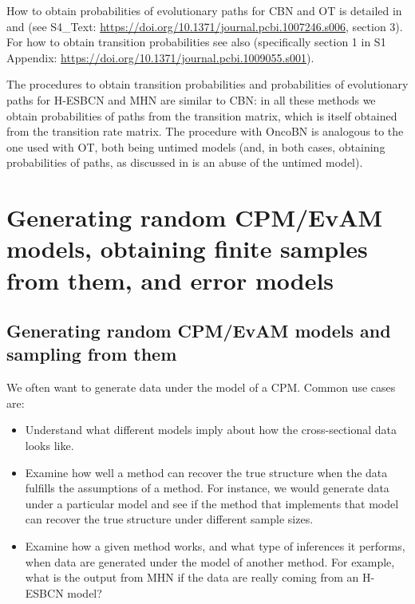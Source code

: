 \documentclass[a4paper,11pt]{article}
\begin{document}
How to obtain probabilities of evolutionary paths for CBN and OT is detailed in \cite{hosseini2019a} and \cite{diaz2019every} (see S4\_Text: \url{https://doi.org/10.1371/journal.pcbi.1007246.s006}, section 3). For how to obtain transition probabilities see also \cite{diaz2021conditional} (specifically section 1 in S1 Appendix: \url{https://doi.org/10.1371/journal.pcbi.1009055.s001}).

The procedures to obtain transition probabilities and probabilities of evolutionary paths for H-ESBCN and MHN are similar to CBN: in all these methods we obtain probabilities of paths from the transition matrix, which is itself obtained from the transition rate matrix. The procedure with OncoBN is analogous to the one used with OT, both being untimed models (and, in both cases, obtaining probabilities of paths, as discussed in \citealp{diaz2019every} is an abuse of the untimed model). 


\section{Generating random CPM/EvAM models, obtaining finite samples from them, and error models}\label{sec:random_evam}


\subsection{Generating random CPM/EvAM models and sampling from them}\label{subsec:random_evam}
We often want to generate data under the model of a CPM. Common use cases are:

\begin{itemize}
\item Understand what different models imply about how the cross-sectional data looks like.

\item Examine how well a method can recover the true structure when the data fulfills the assumptions of a method. For instance, we would generate data under a particular model and see if the method that implements that model can recover the true structure under different sample sizes.

\item Examine how a given method works, and what type of inferences it performs, when data are generated under the model of another method. For example, what is the output from MHN if the data are really coming from an H-ESBCN model?
\end{itemize}
\end{document}
